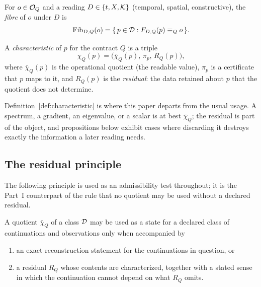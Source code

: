 \begin{definition}\label{def:observation-fibre}
For $o\in\mathcal O_Q$ and a reading $D\in\{t,X,\mathcal K\}$ (temporal, spatial, constructive), the
\emph{fibre} of $o$ under $D$ is
\[
  \operatorname{Fib}_{D,Q}(o)=\{\,p\in\mathcal D : F_{D,Q}(p)\equiv_Q o\,\}.
\]
\end{definition}

\begin{definition}[Characteristic]\label{def:characteristic}
A \emph{characteristic} of $p$ for the contract $Q$ is a triple
\[
  \chi_Q(p)=\bigl(\bar\chi_Q(p),\,\pi_p,\,R_{Q}(p)\bigr),
\]
where $\bar\chi_Q(p)$ is the operational quotient (the readable value),
$\pi_p$ is a certificate that $p$ maps to it, and $R_Q(p)$ is the \emph{residual}:
the data retained about $p$ that the quotient does not determine.
\end{definition}

\begin{remark}
Definition~\ref{def:characteristic} is where this paper departs from the usual
usage.  A spectrum, a gradient, an eigenvalue, or a scalar is at best
$\bar\chi_Q$; the residual is part of the object, and propositions below exhibit
cases where discarding it destroys exactly the information a later reading needs.
\end{remark}

\subsection{The residual principle}

The following principle is used as an admissibility test throughout; it is the
Part~I counterpart of the rule that no quotient may be used without a declared
residual.

\begin{proposal}\label{prop:residual-principle}
A quotient $\bar\chi_Q$ of a class $\mathcal D$ may be used as a state for a declared class
of continuations and observations only when accompanied by
\begin{enumerate}
\item an exact reconstruction statement for the continuations in question, or
\item a residual $R_Q$ whose contents are characterized, together with a stated
  sense in which the continuation cannot depend on what $R_Q$ omits.
\end{enumerate}
\end{proposal}

